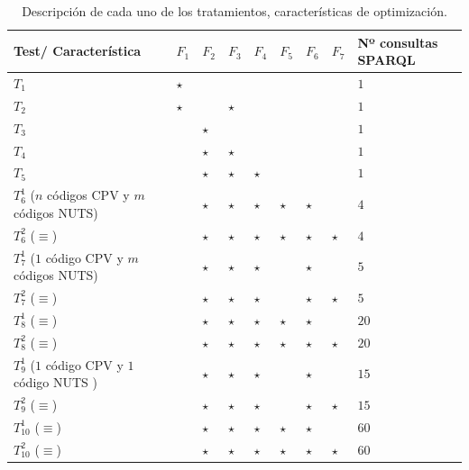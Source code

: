 \begin{enumerate}
\begin{table}[!htb]
\renewcommand{\arraystretch}{1.3}
\begin{center}
\begin{tabular}{|p{3.5cm}|p{0.8cm}|p{0.8cm}|p{0.8cm}|p{0.8cm}|p{0.8cm}|p{0.8cm}|p{0.8cm}|p{2cm}|}
\hline
  \textbf{Test}/ \textbf{Característica}& \textbf{$F_1$} & \textbf{$F_2$} & \textbf{$F_3$} & \textbf{$F_4$} & \textbf{$F_5$} & \textbf{$F_6$} &  \textbf{$F_7$} & \textbf{Nº consultas SPARQL} \\ \hline
   $T_1$ & $\star$ & & & & & & &$1$\\ \hline 
   $T_2$ & $\star$ & & $\star$ & & & & &$1$\\ \hline 
   $T_3$ &  & $\star$ &  & & & & &$1$\\ \hline 
   $T_4$ &  & $\star$ & $\star$ & & & & &$1$\\ \hline 
   $T_5$ &  & $\star$ & $\star$ & $\star$ & & & &$1$\\ \hline 
   $T^{1}_6$ ($n$ códigos CPV y $m$ códigos NUTS)&  & $\star$ & $\star$ & $\star$ & $\star$ & $\star$ & &$4$\\ \hline 
   $T^{2}_6$ ($\equiv$)&  & $\star$ & $\star$ & $\star$ & $\star$ & $\star$ & $\star$ &$4$\\ \hline 
   $T^{1}_7$ ($1$ código CPV y $m$ códigos NUTS) &  & $\star$ & $\star$ & $\star$ &  & $\star$ &  &$5$ \\ \hline 
   $T^{2}_7$ ($\equiv$) & & $\star$ & $\star$ & $\star$ &  & $\star$ & $\star$ &$5$\\ \hline 
   $T^{1}_8$ ($\equiv$)& & $\star$ & $\star$ & $\star$ & $\star$ & $\star$ &  &$20$\\ \hline 
   $T^{2}_8$ ($\equiv$) & & $\star$ & $\star$ & $\star$ & $\star$ & $\star$ &  $\star$ &$20$\\ \hline 
   $T^{1}_9$ ($1$ código CPV y $1$ código NUTS ) & & $\star$ & $\star$ & $\star$ &  & $\star$ & &$15$  \\ \hline 
   $T^{2}_9$ ($\equiv$)& & $\star$ & $\star$ & $\star$ & & $\star$ &  $\star$ &$15$\\ \hline 
   $T^{1}_{10}$ ($\equiv$) & & $\star$ & $\star$ & $\star$ & $\star$ & $\star$ & &$60$  \\ \hline 
   $T^{2}_{10}$ ($\equiv$) & & $\star$ & $\star$ & $\star$ & $\star$ & $\star$ & $\star$ &$60$ \\ \hline 
  \hline
  \end{tabular}
  \caption{Descripción de cada uno de los tratamientos, características de optimización.}
  \label{tabla:tests}
  \end{center}
\end{table} 


\end{enumerate}
